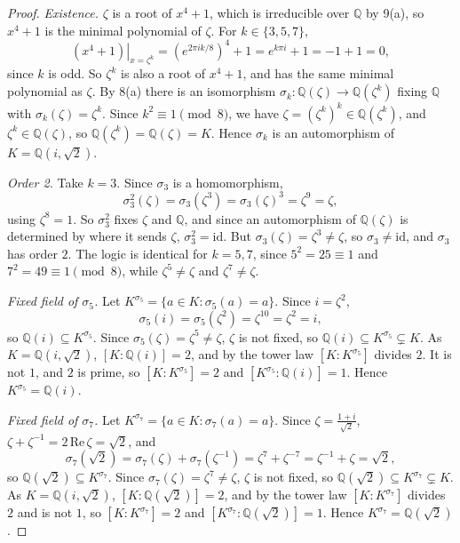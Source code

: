 \documentclass[11pt]{article}
\begin{document}
\begin{proof}
\emph{Existence.} $\zeta$ is a root of $x^4+1$, which is irreducible over
$\mathbb{Q}$ by 9(a), so $x^4+1$ is the minimal polynomial of $\zeta$. For
$k \in \{3,5,7\}$,
\[
  \left.(x^4+1)\right|_{x=\zeta^k} = \left(e^{2\pi i k/8}\right)^4 + 1
  = e^{k\pi i} + 1 = -1 + 1 = 0,
\]
since $k$ is odd. So $\zeta^k$ is also a root of $x^4+1$, and has the same
minimal polynomial as $\zeta$. By 8(a) there is an isomorphism
$\sigma_k\colon \mathbb{Q}(\zeta) \to \mathbb{Q}(\zeta^k)$ fixing $\mathbb{Q}$
with $\sigma_k(\zeta) = \zeta^k$. Since $k^2 \equiv 1 \pmod 8$, we have
$\zeta = (\zeta^k)^k \in \mathbb{Q}(\zeta^k)$, and $\zeta^k \in \mathbb{Q}(\zeta)$,
so $\mathbb{Q}(\zeta^k) = \mathbb{Q}(\zeta) = K$. Hence $\sigma_k$ is an
automorphism of $K = \mathbb{Q}(i,\sqrt{2})$.

\emph{Order 2.} Take $k = 3$. Since $\sigma_3$ is a homomorphism,
\[
  \sigma_3^2(\zeta) = \sigma_3(\zeta^3) = \sigma_3(\zeta)^3 = \zeta^9 = \zeta,
\]
using $\zeta^8 = 1$. So $\sigma_3^2$ fixes $\zeta$ and $\mathbb{Q}$, and since an
automorphism of $\mathbb{Q}(\zeta)$ is determined by where it sends $\zeta$,
$\sigma_3^2 = \mathrm{id}$. But $\sigma_3(\zeta) = \zeta^3 \ne \zeta$, so
$\sigma_3 \ne \mathrm{id}$, and $\sigma_3$ has order $2$. The logic is identical
for $k = 5, 7$, since $5^2 = 25 \equiv 1$ and $7^2 = 49 \equiv 1 \pmod 8$, while
$\zeta^5 \ne \zeta$ and $\zeta^7 \ne \zeta$.

\emph{Fixed field of $\sigma_5$.} Let
$K^{\sigma_5} = \{a \in K : \sigma_5(a) = a\}$. Since $i = \zeta^2$,
\[
  \sigma_5(i) = \sigma_5(\zeta^2) = \zeta^{10} = \zeta^2 = i,
\]
so $\mathbb{Q}(i) \subseteq K^{\sigma_5}$. Since $\sigma_5(\zeta) = \zeta^5 \ne \zeta$,
$\zeta$ is not fixed, so
$\mathbb{Q}(i) \subseteq K^{\sigma_5} \subsetneq K$. As
$K = \mathbb{Q}(i,\sqrt{2})$, $[K:\mathbb{Q}(i)] = 2$, and by the tower law
$[K:K^{\sigma_5}]$ divides $2$. It is not $1$, and $2$ is prime, so
$[K:K^{\sigma_5}] = 2$ and $[K^{\sigma_5}:\mathbb{Q}(i)] = 1$. Hence
$K^{\sigma_5} = \mathbb{Q}(i)$.

\emph{Fixed field of $\sigma_7$.} Let
$K^{\sigma_7} = \{a \in K : \sigma_7(a) = a\}$. Since
$\zeta = \frac{1+i}{\sqrt2}$, $\zeta + \zeta^{-1} = 2\,\mathrm{Re}\,\zeta = \sqrt2$, and
\[
  \sigma_7(\sqrt2) = \sigma_7(\zeta) + \sigma_7(\zeta^{-1})
  = \zeta^7 + \zeta^{-7} = \zeta^{-1} + \zeta = \sqrt2,
\]
so $\mathbb{Q}(\sqrt2) \subseteq K^{\sigma_7}$. Since $\sigma_7(\zeta) = \zeta^7 \ne \zeta$,
$\zeta$ is not fixed, so
$\mathbb{Q}(\sqrt2) \subseteq K^{\sigma_7} \subsetneq K$. As
$K = \mathbb{Q}(i,\sqrt{2})$, $[K:\mathbb{Q}(\sqrt2)] = 2$, and by the tower law
$[K:K^{\sigma_7}]$ divides $2$ and is not $1$, so $[K:K^{\sigma_7}] = 2$ and
$[K^{\sigma_7}:\mathbb{Q}(\sqrt2)] = 1$. Hence $K^{\sigma_7} = \mathbb{Q}(\sqrt2)$.


\end{proof}
\end{document}
